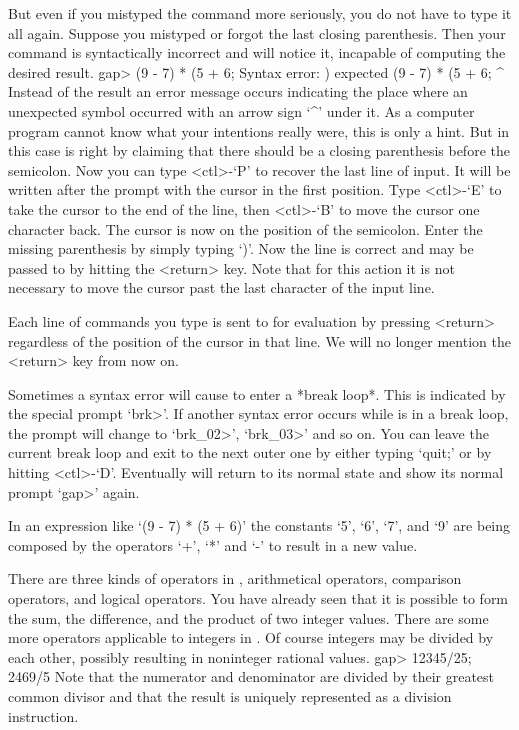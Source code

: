 But even if you  mistyped the command more  seriously, you do not have to
type   it all again. Suppose   you  mistyped or  forgot  the last closing
parenthesis. Then your command is syntactically incorrect and {\GAP} will
notice it, incapable of computing the desired result.
\begintt
    gap> (9 - 7) * (5 + 6;
    Syntax error: ) expected
    (9 - 7) * (5 + 6;
                    ^
\endtt
{}%
Instead of the result an error message  occurs indicating the place where
an unexpected  symbol occurred with   an arrow sign  `^'  under it.  As a
computer program  cannot know what your  intentions really were,  this is
only  a hint. But in this  case {\GAP}  is  right by  claiming that there
should be a closing  parenthesis before the  semicolon. Now you  can type
<ctl>-`P' to recover the last line of input. It will be written after the
prompt with the cursor in the first  position. Type <ctl>-`E' to take the
cursor  to the end of   the line, then <ctl>-`B'   to move the cursor one
character back. The cursor is now on the position of the semicolon. Enter
the missing parenthesis by simply typing `)'. Now the line is correct and
may be passed to {\GAP}  by hitting the <return>  key. Note that for this
action it is not necessary to move the cursor  past the last character of
the input line.

Each line  of commands  you  type is sent to    {\GAP} for evaluation  by
pressing <return> regardless of the position of  the cursor in that line.
We will no longer mention the <return> key from now on.

%
Sometimes a syntax error will cause {\GAP} to enter a *break loop*.  This
is indicated by the special prompt `brk>'. If another syntax error occurs
while  {\GAP} is in  a break loop, the prompt  will  change to `brk_02>',
`brk_03>' and so on. You can leave the current break loop and exit to the
next outer one by either typing `quit;' or by hitting <ctl>-`D'.
Eventually {\GAP} will return to its normal state and show its normal
prompt `gap>' again.

\null

%
In an  expression like `(9  - 7) * (5 +  6)' the constants `5', `6', `7',
and `9' are being composed by the operators `+', `*' and `-' to result in
a new value.

There are  three kinds  of operators in  {\GAP}, arithmetical  operators,
comparison operators, and logical operators.  You  have already seen that
it is possible to form  the sum,  the  difference, and the product of two
integer values.  There are some  more operators applicable to integers in
{\GAP}.   Of  course integers  may  be divided  by  each other,  possibly
resulting in noninteger rational values.
\beginexample
    gap> 12345/25;
    2469/5 
\endexample
Note  that  the numerator and denominator  are divided by their  greatest
common divisor  and that the result is uniquely represented as a division
instruction.

